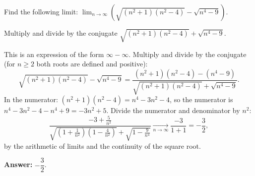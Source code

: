 
\begin{question}
Find the following limit:
$\displaystyle \lim_{n\to\infty}\left(\sqrt{(n^2+1)(n^2-4)}-\sqrt{n^4-9}\right)$.
\end{question}

\begin{hint}
Multiply and divide by the conjugate $\sqrt{(n^2+1)(n^2-4)}+\sqrt{n^4-9}$.
\end{hint}

\begin{solution}
This is an expression of the form $\infty-\infty$. Multiply and divide by the conjugate (for $n\ge 2$ both roots are defined and positive):
\[ \sqrt{(n^2+1)(n^2-4)}-\sqrt{n^4-9} = \frac{(n^2+1)(n^2-4)-(n^4-9)}{\sqrt{(n^2+1)(n^2-4)}+\sqrt{n^4-9}}. \]
In the numerator: $(n^2+1)(n^2-4) = n^4-3n^2-4$, so the numerator is $n^4-3n^2-4-n^4+9 = -3n^2+5$. Divide the numerator and denominator by $n^2$:
\[ \frac{-3+\frac{5}{n^2}}{\sqrt{\left(1+\frac{1}{n^2}\right)\left(1-\frac{4}{n^2}\right)}+\sqrt{1-\frac{9}{n^4}}} \xrightarrow[n\to\infty]{} \frac{-3}{1+1} = -\frac{3}{2}, \]
by the arithmetic of limits and the continuity of the square root.

\textbf{Answer:} $-\dfrac32$.
\end{solution}
